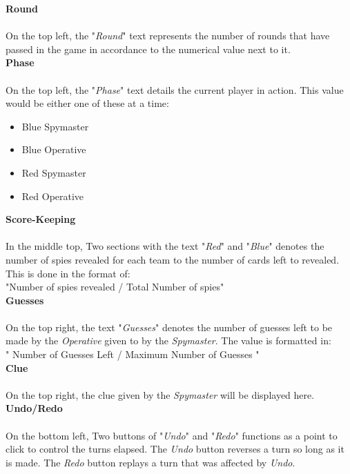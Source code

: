 \documentclass[10pt, a4paper]{article}
\begin{document}
	\textbf{Round}\\
	\\
	On the top left, the "\textit{Round}" text represents the number of rounds that have passed in the game in accordance to the numerical value next to it.\\
	
	\textbf{Phase}\\
	\\
	On the top left, the "\textit{Phase}" text details the current player in action. This value would be either one of these at a time:
	\begin{itemize}
		\item Blue Spymaster
		\item Blue Operative
		\item Red Spymaster
		\item Red Operative
	\end{itemize}
	
	\textbf{Score-Keeping}\\
	\\
	In the middle top, Two sections with the text "\textit{Red}" and "\textit{Blue}" denotes the number of spies revealed for each team to the number of cards left to revealed. This is done in the format of:\\
	
	"Number of spies revealed / Total Number of spies"\\
	
	\textbf{Guesses}\\
	\\
	On the top right, the text "\textit{Guesses}" denotes the number of guesses left to be made by the \textit{Operative} given to by the \textit{Spymaster}. The value is formatted in: \\
	
	" Number of Guesses Left / Maximum Number of Guesses "\\
	
	\textbf{Clue}\\
	\\
	On the top right, the clue given by the \textit{Spymaster} will be displayed here.\\
	
	\textbf{Undo/Redo}\\
	\\
	On the bottom left, Two buttons of "\textit{Undo}" and "\textit{Redo}" functions as a point to click to control the turns elapsed. The \textit{Undo} button reverses a turn so long as it is made. The \textit{Redo} button replays a turn that was affected by \textit{Undo}.\\
	
\end{document}
